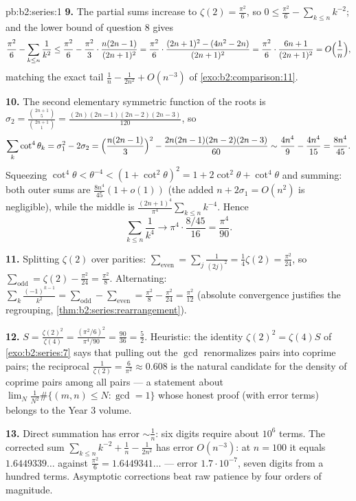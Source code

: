 \begin{solution}{pb:b2:series:1}
\textbf{9.} The partial sums increase to $\zeta(2) =
\frac{\pi^2}6$, so $0 \leq \frac{\pi^2}6 - \sum_{k\leq n}k^{-2}$;
and the lower bound of question 8 gives
\[
\frac{\pi^2}6 - \sum_{k\leq n}\frac1{k^2}
\leq \frac{\pi^2}6 - \frac{\pi^2}3\cdot\frac{n(2n-1)}{(2n+1)^2}
= \frac{\pi^2}6\cdot\frac{(2n+1)^2 - (4n^2 -
2n)}{(2n+1)^2}
= \frac{\pi^2}6\cdot\frac{6n + 1}{(2n+1)^2}
= O\Bigl(\frac1n\Bigr),
\]
matching the exact tail $\frac1n - \frac1{2n^2} + O(n^{-3})$ of
\cref{exo:b2:comparison:11}.

\textbf{10.} The second elementary symmetric function of the
roots is $\sigma_2 = \frac{\binom{2n+1}5}{\binom{2n+1}1} =
\frac{(2n)(2n-1)(2n-2)(2n-3)}{120}$, so
\[
\sum_k\cot^4\theta_k = \sigma_1^2 - 2\sigma_2
= \Bigl(\frac{n(2n-1)}3\Bigr)^2 -
\frac{2n(2n-1)(2n-2)(2n-3)}{60}
\sim \frac{4n^4}9 - \frac{4n^4}{15} = \frac{8n^4}{45}.
\]
Squeezing $\cot^4\theta < \theta^{-4} < (1 + \cot^2\theta)^2 =
1 + 2\cot^2\theta + \cot^4\theta$ and summing: both outer sums
are $\frac{8n^4}{45}(1 + o(1))$ (the added $n + 2\sigma_1 =
O(n^2)$ is negligible), while the middle is
$\frac{(2n+1)^4}{\pi^4}\sum_{k\leq n}k^{-4}$. Hence
\[
\sum_{k\leq n}\frac1{k^4} \longrightarrow
\pi^4\cdot\frac{8/45}{16} = \frac{\pi^4}{90}.
\]

\textbf{11.} Splitting $\zeta(2)$ over parities: $\sum_{\text{even}}
= \sum_j\frac{1}{(2j)^2} = \frac14\zeta(2) = \frac{\pi^2}{24}$,
so $\sum_{\text{odd}} = \zeta(2) - \frac{\pi^2}{24} =
\frac{\pi^2}8$. Alternating: $\sum_k\frac{(-1)^{k-1}}{k^2} =
\sum_{\text{odd}} - \sum_{\text{even}} = \frac{\pi^2}8 -
\frac{\pi^2}{24} = \frac{\pi^2}{12}$ (absolute convergence
justifies the regrouping,
\cref{thm:b2:series:rearrangement}).

\textbf{12.} $S = \frac{\zeta(2)^2}{\zeta(4)} =
\frac{(\pi^2/6)^2}{\pi^4/90} = \frac{90}{36} = \frac52$.
Heuristic: the identity $\zeta(2)^2 = \zeta(4)S$ of
\cref{exo:b2:series:7} says that pulling out the $\gcd$
renormalizes pairs into coprime pairs; the reciprocal
$\frac1{\zeta(2)} = \frac6{\pi^2} \approx 0.608$ is the natural
candidate for the density of coprime pairs among all pairs ---
a statement about $\lim_N \frac{1}{N^2}\#\{(m,n) \leq N :
\gcd = 1\}$ whose honest proof (with error terms) belongs to
the Year 3 volume.

\textbf{13.} Direct summation has error $\sim \frac1n$: six
digits require about $10^6$ terms. The corrected sum
$\sum_{k\leq n}k^{-2} + \frac1n - \frac1{2n^2}$ has error
$O(n^{-3})$: at $n = 100$ it equals $1.6449339\dots$ against
$\frac{\pi^2}6 = 1.6449341\dots$ --- error $1.7\cdot10^{-7}$,
seven digits from a hundred terms. Asymptotic corrections beat
raw patience by four orders of magnitude.


\end{solution}
